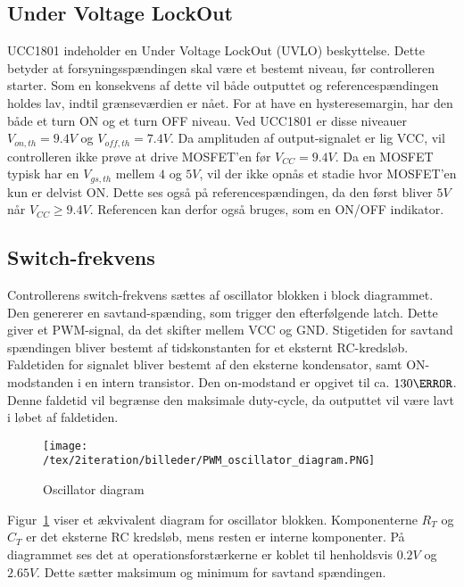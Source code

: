 \subsection{Under Voltage LockOut}
UCC1801 indeholder en Under Voltage LockOut (UVLO) beskyttelse. Dette betyder at forsyningsspændingen skal være et bestemt niveau, før controlleren starter. Som en konsekvens af dette vil både outputtet og referencespændingen holdes lav, indtil grænseværdien er nået. For at have en hysteresemargin, har den både et turn ON og et turn OFF niveau. Ved UCC1801 er disse niveauer $V_{on,th}=9.4V$ og $V_{off,th}=7.4V$. Da amplituden af output-signalet er lig VCC, vil controlleren ikke prøve at drive MOSFET'en før $V_{CC}=9.4V$. Da en MOSFET typisk har en $V_{gs,th}$ mellem $4$ og $5V$, vil der ikke opnås et stadie hvor MOSFET'en kun er delvist ON. Dette ses også på referencespændingen, da den først bliver $5V$ når $V_{CC}\geqslant 9.4V$. Referencen kan derfor også bruges, som en ON/OFF indikator. 

\subsection{Switch-frekvens}
Controllerens switch-frekvens sættes af oscillator blokken i block diagrammet. Den genererer en savtand-spænding, som trigger den efterfølgende latch. Dette giver et PWM-signal, da det skifter mellem VCC og GND.
Stigetiden for savtand spændingen bliver bestemt af tidskonstanten for et eksternt RC-kredsløb. Faldetiden for signalet bliver bestemt af den eksterne kondensator, samt ON-modstanden i en intern transistor. Den on-modstand er opgivet til ca. $130\ohm$. Denne faldetid vil begrænse den maksimale duty-cycle, da outputtet vil være lavt i løbet af faldetiden. 

\begin{figure}[H]
	\center
	\texttt{[image: /tex/2iteration/billeder/PWM\_oscillator\_diagram.PNG]}
	\caption{Oscillator diagram}
	\label{fig:PWM_oscillator_diagram}
\end{figure}

Figur~\ref{fig:PWM_oscillator_diagram} viser et ækvivalent diagram for oscillator blokken. Komponenterne $R_T$ og $C_T$ er det eksterne RC kredsløb, mens resten er interne komponenter. På diagrammet ses det at operationsforstærkerne er koblet til henholdsvis $0.2V$ og $2.65V$. Dette sætter maksimum og minimum for savtand spændingen. 

